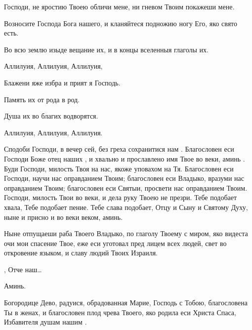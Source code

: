 \begin{mymulticols}
 Господи, не яростию Твоею обличи мене, ни гневом Твоим покажеши мене.

 Возносите Господа Бога нашего, и кланяйтеся подножию ногу Его, яко свято есть.

 Во всю землю изыде вещание их, и в концы вселенныя глаголы их.

 Аллилуия, Аллилуия, Аллилуия, 

 Блажени яже избра и прият я Господь.

 Память их от рода в род.

 Душа их во благих водворятся.

 Аллилуия, Аллилуия, Аллилуия.

 Сподоби Господи, в вечер сей, без греха сохранитися нам . Благословен еси Господи Боже отец наших , и хвально и прославлено имя Твое во веки, аминь . Буди Господи, милость Твоя на нас, якоже уповахом на Тя. Благословен еси Господи, научи нас оправданием Твоим; благословен еси Владыко, вразуми нас оправданием Твоим; благословен еси Святыи, просвети нас оправданием Твоим. Господи, милость Твои во веки, и дела руку Твоею не презри. Тебе подобает хвала, Тебе подобает пение. Тебе слава подобает, Отцу и Сыну и Святому Духу, ныне и присно и во веки веком, аминь.


 Ныне отпущаеши раба Твоего Владыко, по глаголу Твоему с миром, яко видеста очи мои спасение Твое, еже еси уготовал пред лицем всех людей, свет во откровение языком, и славу людий Твоих Израиля.

 ,  Отче наш…


Аминь.



Богородице Дево, радуися, обрадованная Марие, Господь с Тобою, благословена Ты в женах, и благословен плод чрева Твоего, яко родила еси Христа Спаса, Избавителя душам нашим .


\end{mymulticols}
